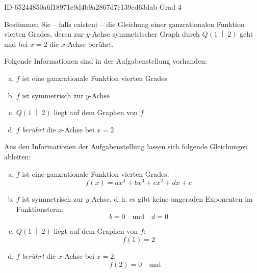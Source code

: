 \begin{exercise}
      {ID-65244850a6f18971e9d4b9a2867d7c139ed63dab}
      {Grad 4}
  \ifproblem\problem\par
    Bestimmen Sie -- falls existent -- die Gleichung
    einer ganzrationalen Funktion vierten Grades,
    deren zur $y$-Achse symmetrischer Graph durch
    $Q\left(1\;\middle|\;2\right)$ geht und bei
    $x=2$ die $x$-Achse berührt.
  \fi
  \ifoutline\outline\par
    Folgende Informationen sind in der
    Aufgabenstellung vorhanden:
    \begin{enumerate}[a)]
      \item $f$ ist eine ganzrationale Funktion
            vierten Grades
      \item $f$ ist symmetrisch zur $y$-Achse
      \item $Q\left(1\;\middle|\;2\right)$ liegt
            auf dem Graphen von $f$
      \item $f$ \emph{berührt} die $x$-Achse bei
            $x=2$
    \end{enumerate}
  \fi
  \ifoutcome\outcome\par
    Aus den Informationen der Aufgabenstellung
    lassen sich folgende Gleichungen ableiten:
    \begin{enumerate}[a)]
      \item $f$ ist eine ganzrationale Funktion
            vierten Grades:
            \begin{equation*}
              f(x)=ax^4+bx^3+cx^2+dx+e
            \end{equation*}
      \item $f$ ist symmetrisch zur $y$-Achse,
            d.\,h. es gibt keine ungeraden
            Exponenten im Funktionsterm:
            \begin{equation*}
              b=0
              \quad\text{und}\quad
              d=0
            \end{equation*}
      \item $Q\left(1\;\middle|\;2\right)$ liegt
            auf dem Graphen von $f$:
            \begin{equation*}
              f(1)=2
            \end{equation*}
      \item $f$ \emph{berührt} die $x$-Achse bei
            $x=2$:
            \begin{equation*}
              f(2)=0
              \quad\text{und}\quad

\end{equation*}
\end{enumerate}
\end{exercise}
